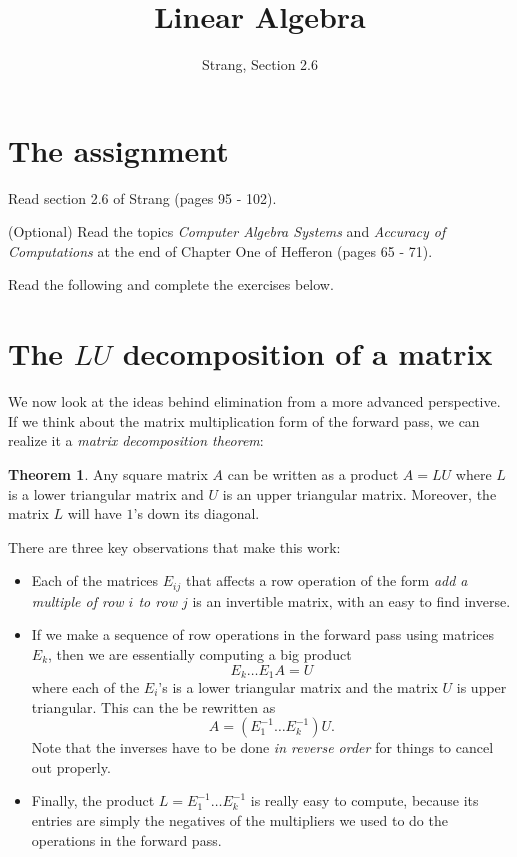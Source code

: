 \documentclass[11pt]{amsart}
\theoremstyle{definition}
\newtheorem*{theorem}{Theorem}
\begin{document}
\title{Linear Algebra}
\author{Strang, Section 2.6}
\maketitle

\section{The assignment}
\begin{compactitem}
\item Read section 2.6 of Strang (pages 95 - 102).
\item (Optional) Read the topics \emph{Computer Algebra Systems} and \emph{Accuracy of Computations} at the end of Chapter One of Hefferon (pages 65 - 71).
\item Read the following and complete the exercises below.
\end{compactitem}


\section{The $LU$ decomposition of a matrix}

We now look at the ideas behind elimination from a more advanced perspective. If we think about the matrix multiplication form of the forward pass, we can realize it a \emph{matrix decomposition theorem}:

\begin{theorem} Any square matrix $A$ can be written as a product $A = LU$ where $L$ is a lower triangular matrix and $U$ is an upper triangular matrix. Moreover, the matrix $L$ will have $1$'s down its diagonal.
\end{theorem}

There are three key observations that make this work:
\begin{itemize}
\item Each of the matrices $E_{ij}$ that affects a row operation of the form \emph{add a multiple of row $i$ to row $j$} is an invertible matrix, with an easy to find inverse.

\item If we make a sequence of row operations in the forward pass using matrices $E_k$, then we are essentially computing a big product
\[
E_k \dots E_1 A = U
\]
where each of the $E_i$'s is a lower triangular matrix and the matrix $U$ is upper triangular. This can the be rewritten as
\[
A = \left(E_1^{-1} \dots E_k^{-1} \right) U .
\]
Note that the inverses have to be done \emph{in reverse order} for things to cancel out properly.

\item Finally, the product $L = E_1^{-1} \dots E_k^{-1}$ is really easy to compute, because its entries are simply the negatives of the multipliers we used to do the operations in the forward pass.
\end{itemize}
\end{document}

